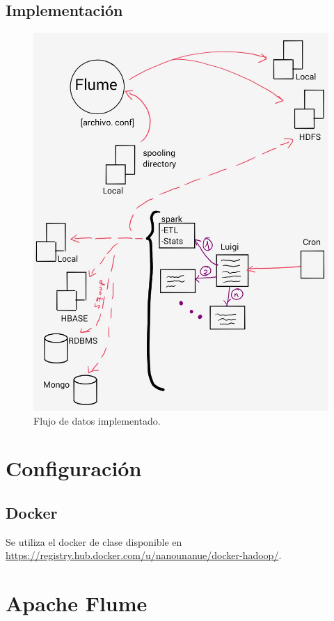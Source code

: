 \documentclass[]{article}
\begin{document}
\subsection{Implementación}\label{implementacion}

\begin{figure}[H]
\centering
\includegraphics[width=0.8 \textwidth]{img/arquitectura.jpg}
\caption{Flujo de datos implementado.}
\end{figure}

\section{Configuración}\label{configuracion}

\subsection{Docker}\label{docker}

Se utiliza el docker de clase disponible en
\url{https://registry.hub.docker.com/u/nanounanue/docker-hadoop/}.

\section{Apache Flume}\label{apache-flume}
\end{document}
